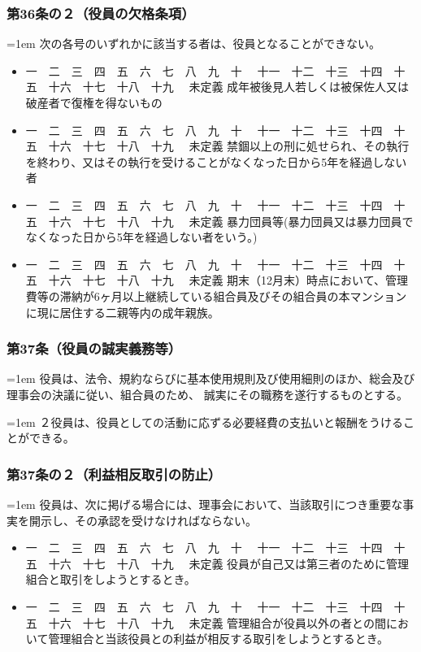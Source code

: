 \documentclass[
  luatex,
  paper=a4paper,
  fontsize=11pt,
  jafontsize=11pt,
  jlreq_notes,
]{jlreq}
\newcommand{\joumain}[1]{%
  \noindent\hangindent=1em\hangafter=1
  \hspace{1em}#1%
}
\newcommand{\kou}[2]{%
  \par\noindent\hangindent=1em\hangafter=1
  #1\hspace{1em}#2%
}
\def\toKansuji#1{
  \tempvls=#1
  \ifcase\tempvls
    \or 一　\or 二　\or 三　\or 四　\or 五　\or 六　\or 七　\or 八　\or 九　\or 十　
    \or 十一　\or 十二　\or 十三　\or 十四　\or 十五　\or 十六　\or 十七　\or 十八　\or 十九　
  \else 未定義
  \fi
}
\begin{document}
  \subsubsection*{第36条の２（役員の欠格条項）}
  \joumain{次の各号のいずれかに該当する者は、役員となることができない。}
  \begin{itemize}[label={}, leftmargin=3em, itemindent=-2em]
    \item \toKansuji{1}成年被後見人若しくは被保佐人又は破産者で復権を得ないもの
    \item \toKansuji{2}禁錮以上の刑に処せられ、その執行を終わり、又はその執行を受けることがなくなった日から5年を経過しない者
    \item \toKansuji{3}暴力団員等(暴力団員又は暴力団員でなくなった日から5年を経過しない者をいう。)
    \item \toKansuji{4}期末（12月末）時点において、管理費等の滞納が6ヶ月以上継続している組合員及びその組合員の本マンションに現に居住する二親等内の成年親族。
  \end{itemize}

  \subsubsection*{第37条（役員の誠実義務等）}
  \joumain{役員は、法令、規約ならびに基本使用規則及び使用細則のほか、総会及び理事会の決議に従い、組合員のため、
  誠実にその職務を遂行するものとする。}
  \kou{２}{役員は、役員としての活動に応ずる必要経費の支払いと報酬をうけることができる。}

  \subsubsection*{第37条の２（利益相反取引の防止）}
  \joumain{役員は、次に掲げる場合には、理事会において、当該取引につき重要な事実を開示し、その承認を受けなければならない。}
  \begin{itemize}[label={}, leftmargin=3em, itemindent=-2em]
    \item \toKansuji{1}役員が自己又は第三者のために管理組合と取引をしようとするとき。
    \item \toKansuji{2}管理組合が役員以外の者との間において管理組合と当該役員との利益が相反する取引をしようとするとき。
  \end{itemize}
\end{document}
